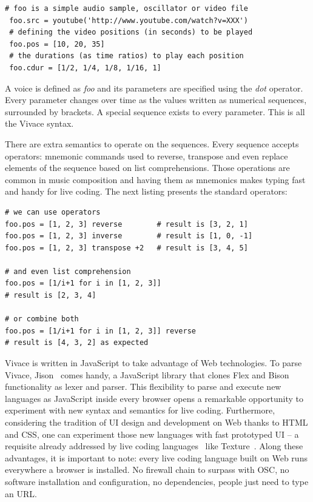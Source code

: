 \documentclass[letterpaper, 12pt]{article}
\begin{document}
\begin{Verbatim}[fontfamily=courier, xleftmargin=\parindent]
 # foo is a simple audio sample, oscillator or video file
 foo.src = youtube('http://www.youtube.com/watch?v=XXX')
 # defining the video positions (in seconds) to be played
 foo.pos = [10, 20, 35]
 # the durations (as time ratios) to play each position
 foo.cdur = [1/2, 1/4, 1/8, 1/16, 1]
\end{Verbatim}

A voice is defined as \textit{foo} and its parameters are specified
using the \textit{dot} operator. Every parameter changes over time as
the values written as numerical sequences, surrounded by brackets. A
special sequence exists to every parameter.  This is all the Vivace
syntax.

There are extra semantics to operate on the sequences. Every sequence
accepts operators: mnemonic commands used to reverse, transpose and
even replace elements of the sequence based on list
comprehensions. Those operations are common in music composition and
having them as mnemonics makes typing fast and handy for live
coding. The next listing presents the standard operators:

\begin{Verbatim}[fontfamily=courier, xleftmargin=\parindent]
# we can use operators
foo.pos = [1, 2, 3] reverse        # result is [3, 2, 1]
foo.pos = [1, 2, 3] inverse        # result is [1, 0, -1]
foo.pos = [1, 2, 3] transpose +2   # result is [3, 4, 5]

# and even list comprehension
foo.pos = [1/i+1 for i in [1, 2, 3]] 
# result is [2, 3, 4]

# or combine both
foo.pos = [1/i+1 for i in [1, 2, 3]] reverse 
# result is [4, 3, 2] as expected
\end{Verbatim}

Vivace is written in JavaScript to take advantage of Web technologies.
To parse Vivace, Jison~\citep*{jison} comes handy, a JavaScript
library that clones Flex and Bison functionality as lexer and
parser. This flexibility to parse and execute new languages as
JavaScript inside every browser opens a remarkable opportunity to
experiment with new syntax and semantics for live
coding. Furthermore, considering the tradition of UI design and
development on Web thanks to HTML and CSS, one can experiment those
new languages with fast prototyped UI -- a requisite already addressed
by live coding languages~\citep*{magnusson2011algorithms} like
Texture~\citep*{mclean2011texture}. Along these advantages, it is
important to note: every live coding language built on Web runs
everywhere a browser is installed. No firewall chain to surpass with
OSC, no software installation and configuration, no dependencies,
people just need to type an URL.
\end{document}
